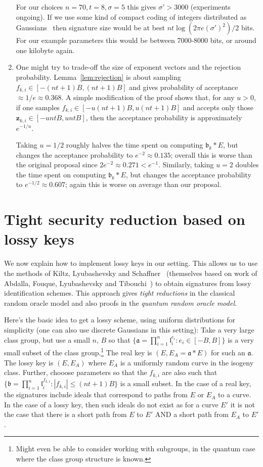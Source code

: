 \documentclass{llncs}
\renewcommand{\a}{\mathfrak{a}}
\renewcommand{\b}{\mathfrak{b}}
\renewcommand{\l}{\mathfrak{l}}
\newcommand{\z}{\mathbf{z}}
\begin{document}
\begin{enumerate}
For our choices $n=70, t = 8, \sigma = 5$ this gives $\sigma' > 3000$ (experiments ongoing).
If we use some kind of compact coding of integers distributed as Gaussians~\cite{DDLL13} then signature size would be at best $nt \log( 2 \pi e (\sigma')^2 )/2$ bits.
For our example parameters this would be between 7000-8000 bits, or around one kilobyte again.

\item One might try to trade-off the size of exponent vectors and the rejection probability. Lemma~\ref{lem:rejection} is about sampling $f_{k,i} \in [ -(nt+1)B, (nt+1)B ]$ and gives probability of acceptance $\approx 1/e \approx 0.368$.
A simple modification of the proof shows that, for any $u > 0$, if one samples $f_{k,i} \in [ -u(nt+1)B, u(nt+1)B ]$ and accepts only those $\z_{k,i} \in [ -untB, untB ]$, then the acceptance probability is approximately $e^{-1/u}$.

Taking $u = 1/2$ roughly halves the time spent on computing $\b_k * E$, but changes the acceptance probability to $e^{-2}  \approx 0.135$; overall this is worse than the original proposal since $2 e^{-2} \approx 0.271 < e^{-1}$.
Similarly, taking $u = 2$ doubles the time spent on computing $\b_k * E$, but changes the acceptance probability to $e^{-1/2} \approx 0.607$; again this is worse on average than our proposal.
\end{enumerate}


\section{Tight security reduction based on lossy keys}\label{sec:lossy-keys}


We now explain how to implement lossy keys in our setting.
This allows us to use the methods of Kiltz, Lyubashevsky and Schaffner~\cite{KLS18} (themselves based on work of Abdalla, Fouque, Lyubashevsky and Tibouchi~\cite{AFLT12}) to obtain signatures from lossy identification schemes. This approach gives \emph{tight reductions} in the classical random oracle model and also proofs in the \emph{quantum random oracle model}.


Here's the basic idea to get a lossy scheme, using uniform distributions for simplicity (one can also use discrete Gaussians in this setting):
Take a very large class group, but use a small $n$, $B$ so that $\{ \a = \prod_{i=1}^n \l_i^{e_i} : e_i \in [-B,B] \}$ is a very small subset of the class group.\footnote{Might even be able to consider working with subgroups, in the quantum case where the class group structure is known.}
The real key is $(E, E_A = \a*E )$ for such an $\a$.
The lossy key is $(E, E_A )$ where $E_A$ is a uniformly random curve in the isogeny class.
Further, chooose parameters so that the $f_{k,i}$ are also such that $\{ \b = \prod_{i=1}^n \l_i^{f_{k,i}} : |f_{k,i}| \le (nt+1)B \}$ is a small subset.
In the case of a real key, the signatures include ideals that correspond to paths from $E$ or $E_A$ to a  curve.
In the case of a lossy key, then such ideals do not exist as for a curve $E'$ it is not the case that there is a short path from $E$ to $E'$ AND a short path from $E_A$ to $E'$.
\end{document}
